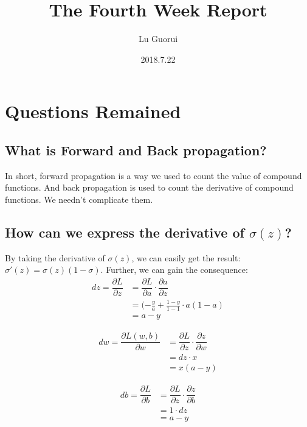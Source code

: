 \documentclass[10pt]{article}
\title{The Fourth Week Report}
\author{Lu Guorui}
\date{2018.7.22}
\begin{document}
\maketitle
\renewcommand{\contentsname}{Contents}
\tableofcontents
\newpage

\section{Questions Remained}

\subsection{What is Forward and Back propagation?}
\indent In short, forward propagation is a way we used to count the value of compound functions. And back propagation is used to count the derivative of compound functions. We needn't complicate them.

\subsection{How can we express the derivative of $\sigma(z)$?}
\indent By taking the derivative of $\sigma(z)$, we can easily get the result:$\sigma'(z)=\sigma(z)(1-\sigma)$.
\indent Further, we can gain the consequence:
\begin{align}
dz = \dfrac{\partial L}{\partial z} &= \dfrac{\partial L}{\partial a}\cdot\dfrac{\partial a}{\partial z}  \\
&= (-\frac{y}{a}+\frac{1-y}{1-1}\cdot a(1-a) \\
&= a-y
\end{align}

\begin{align}
dw = \dfrac{\partial L(w,b)}{\partial w}&=\dfrac{\partial L}{\partial z}\cdot\dfrac{\partial z}{\partial w} \\
&=dz\cdot x  \\
&=x(a-y) 
\end{align}

\begin{align}
db = \dfrac{\partial L}{\partial b} &=\dfrac{\partial L}{\partial z}\cdot\dfrac{\partial z}{\partial b}  \\
&= 1\cdot dz \\
&= a-y
\end{align}

\hypersetup{
	bookmarks=true,
	colorlinks=true,
	linkcolor=red,
	urlcolor=blue
	}
\end{document}
